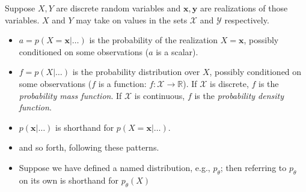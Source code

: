 \documentclass[12pt,letterpaper]{article}
\begin{document}
Suppose $X, Y$ are discrete random variables and $\mathbf{x}, \mathbf{y}$ are realizations of those variables. $X$ and $Y$ may take on values in the sets $\mathcal{X}$ and $\mathcal{Y}$ respectively.
\begin{itemize}
    \item $a = p(X = \mathbf{x} | \ldots)$ is the probability of the realization $X = \mathbf{x}$, possibly conditioned on some observations ($a$ is a scalar).
    \item $f = p(X | \ldots)$ is the probability distribution over $X$, possibly conditioned on some observations ($f$ is a function: $f: \mathcal{X} \rightarrow \mathbb{R}$). If $\mathcal{X}$ is discrete, $f$ is the \emph{probability mass function}. If $\mathcal{X}$ is continuous, $f$ is the \emph{probability density function}.
    \item $p(\mathbf{x} | \ldots)$ is shorthand for $p(X = \mathbf{x} | \ldots)$.
    \item and so forth, following these patterns.
    \item Suppose we have defined a named distribution, e.g., $p_{\theta}$; then referring to $p_{\theta}$ on its own is shorthand for $p_{\theta}(X)$
\end{itemize}
\end{document}
